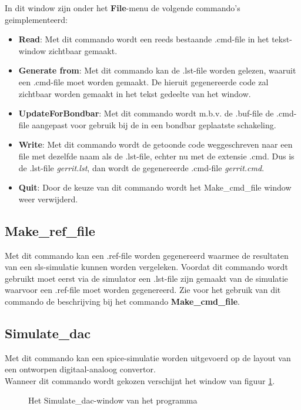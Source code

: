 In dit window zijn onder het {\bf File}-menu de volgende commando's geimplementeerd:
\begin{itemize}
\item {\bf Read}: Met dit commando wordt een reeds bestaande .cmd-file in het
	tekst-window zichtbaar gemaakt.
\item {\bf Generate from}: Met dit commando kan de .lst-file worden gelezen, waaruit een
            .cmd-file moet worden gemaakt. De hieruit gegenereerde code
            zal zichtbaar worden gemaakt in het tekst gedeelte van het
            window.
\item {\bf UpdateForBondbar}: Met dit commando wordt m.b.v. de .buf-file de .cmd-file
             aangepast voor gebruik bij de in een bondbar
             geplaatste schakeling.
\item {\bf Write}: Met dit commando wordt de getoonde code weggeschreven naar een
             file met dezelfde naam als de .lst-file, echter nu met de
             extensie .cmd. Dus is de .lst-file {\it gerrit.lst}, dan wordt
             de gegenereerde .cmd-file {\it gerrit.cmd}.
\item {\bf Quit}: Door de keuze van dit commando wordt het Make\_cmd\_file window
              weer verwij\-derd.
\end{itemize}

\subsection{Make\_ref\_file}
Met dit commando kan een .ref-file worden gegenereerd waarmee de resultaten
van een sls-simulatie kunnen worden vergeleken.
Voordat dit commando wordt gebruikt moet eerst via de simulator een .lst-file
zijn gemaakt van de simulatie waarvoor een .ref-file moet worden gegenereerd.
Zie voor het gebruik van dit commando de beschrijving bij het commando {\bf Make\_cmd\_file}.

\subsection{Simulate\_dac}
\label{dac-section}
Met dit commando kan een spice-simulatie worden uitgevoerd op de layout van
een ontworpen digitaal-analoog convertor.\\
Wanneer dit commando wordt gekozen verschijnt het window van figuur \ref{dac-window}.

\begin{figure}[htb]
\centerline{}
\caption{Het Simulate\_dac-window van het programma }
\label{dac-window}
\end{figure}

